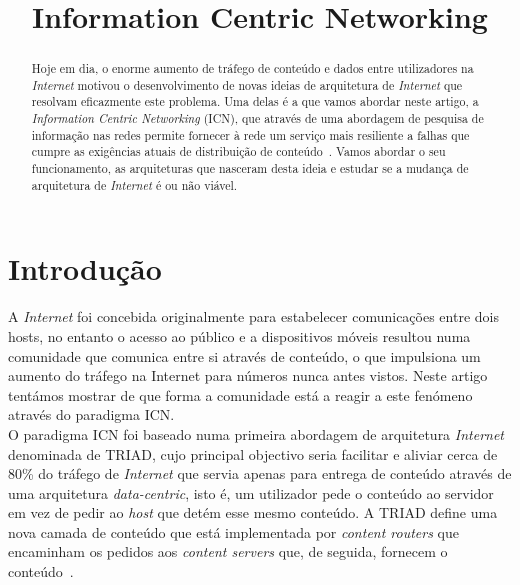 \documentclass[conference]{IEEEtran}
\begin{document}
\title{Information Centric Networking}

\author{

}

\maketitle

\begin{abstract}
Hoje em dia, o enorme aumento de tr\'{a}fego de conte\'{u}do e dados entre utilizadores na \textit{Internet} motivou o desenvolvimento de novas ideias de arquitetura de \textit{Internet} que resolvam eficazmente este problema. Uma delas \'{e} a que vamos abordar neste artigo, a \textit{Information Centric Networking} (ICN), que atrav\'{e}s de uma abordagem de pesquisa de informa\c{c}\~{a}o nas redes permite fornecer \`{a} rede um servi\c{c}o mais resiliente a falhas que cumpre as exig\^{e}ncias atuais de distribui\c{c}\~{a}o de conte\'{u}do~\cite{ahlgren}. Vamos abordar o seu funcionamento, as arquiteturas que nasceram desta ideia e estudar se a mudan\c{c}a de arquitetura de \textit{Internet} \'{e} ou n\~{a}o vi\'{a}vel. 
\end{abstract}

\section{Introdu\c{c}\~{a}o}


A \textit{Internet} foi concebida originalmente para estabelecer comunicações entre dois hosts, no entanto o acesso ao público e a dispositivos móveis resultou numa comunidade que comunica entre si através de conteúdo, o que impulsiona um aumento do tráfego na Internet para números nunca antes vistos. Neste artigo tentámos mostrar de que forma a comunidade está a reagir a este fenómeno através do paradigma ICN\cite{cdnToICN}.\\

O paradigma ICN foi baseado numa primeira abordagem de arquitetura \textit{Internet} denominada de TRIAD\cite{triad}, cujo principal objectivo seria facilitar e aliviar cerca de 80\% do tr\'{a}fego de \textit{Internet} que servia apenas para entrega de conte\'{u}do atrav\'{e}s de uma arquitetura \textit{data-centric}, isto \'{e}, um utilizador pede o conte\'{u}do ao servidor em vez de pedir ao \textit{host} que det\'{e}m esse mesmo conte\'{u}do\cite{ahlgren}. A TRIAD define uma nova camada de conte\'{u}do que est\'{a} implementada por \textit{content routers} que encaminham os pedidos aos \textit{content servers} que, de seguida, fornecem o conte\'{u}do~.\\
\end{document}
